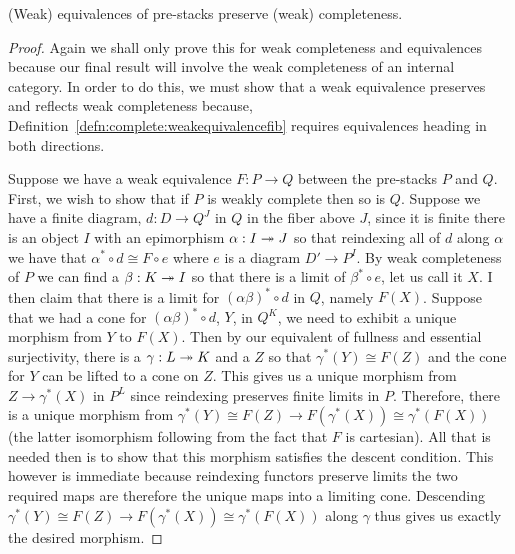\begin{thm}\label{thm:complete:completefibration}
  (Weak) equivalences of pre-stacks preserve (weak) completeness.
\end{thm}
\begin{proof}
  Again we shall only prove this for weak completeness and
  equivalences because our final result will involve the weak
  completeness of an internal category. In order to do this, we must
  show that a weak equivalence preserves and reflects weak
  completeness because,
  Definition~\ref{defn:complete:weakequivalencefib} requires
  equivalences heading in both directions.

  Suppose we have a weak equivalence $F : P \to Q$ between the
  pre-stacks $P$ and $Q$. First, we wish to show that if $P$ is weakly
  complete then so is $Q$. Suppose we have a finite diagram,
  $d : D \to Q^J$ in $Q$ in the fiber above $J$, since it is finite
  there is an object $I$ with an epimorphism $\alpha : I \twoheadrightarrow J$ so
  that reindexing all of $d$ along $\alpha$ we have that
  $\alpha^* \circ d \cong F \circ e$ where $e$ is a diagram
  $D' \to P^I$. By weak completeness of $P$ we can find a
  $\beta : K \twoheadrightarrow I$ so that there is a limit of $\beta^* \circ e$,
  let us call it $X$. I then claim that there is a limit for
  $(\alpha\beta)^* \circ d$ in $Q$, namely $F(X)$. Suppose that we had
  a cone for $(\alpha\beta)^* \circ d$, $Y$, in $Q^K$, we need to
  exhibit a unique morphism from $Y$ to $F(X)$. Then by our equivalent
  of fullness and essential surjectivity, there is a
  $\gamma : L \twoheadrightarrow K$ and a $Z$ so that $\gamma^*(Y) \cong F(Z)$ and
  the cone for $Y$ can be lifted to a cone on $Z$. This gives us a
  unique morphism from $Z \to \gamma^*(X)$ in $P^L$ since reindexing
  preserves finite limits in $P$. Therefore, there is a unique
  morphism from
  $\gamma^*(Y) \cong F(Z) \to F(\gamma^*(X)) \cong \gamma^*(F(X))$
  (the latter isomorphism following from the fact that $F$ is
  cartesian). All that is needed then is to show that this morphism
  satisfies the descent condition. This however is immediate because
  reindexing functors preserve limits the two required maps are
  therefore the unique maps into a limiting cone. Descending
  $\gamma^*(Y) \cong F(Z) \to F(\gamma^*(X)) \cong \gamma^*(F(X))$
  along $\gamma$ thus gives us exactly the desired morphism.


\end{proof}
